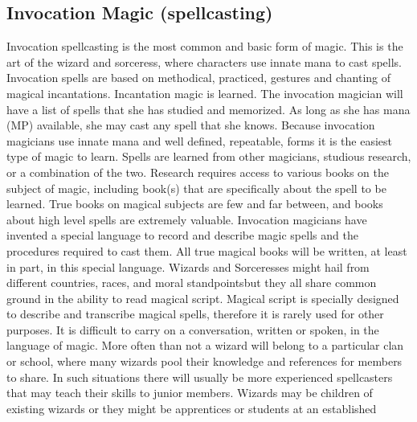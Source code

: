 \documentclass[twoside]{book}
\begin{document}
\subsection{Invocation Magic (spellcasting)}
      Invocation spellcasting is the most common and
               basic form of magic. This is the art of the wizard and
               sorceress, where characters use innate mana to cast
               spells. Invocation spells are based on methodical,
               practiced, gestures and chanting of magical incantations.
                 Incantation magic is learned. The invocation
               magician will have a list of spells that she has studied
               and memorized. As long as she has mana (MP) available, she
               may cast any spell that she knows. Because invocation
               magicians use innate mana and well defined, repeatable,
               forms it is the easiest type of magic to learn.   Spells are learned from other magicians, studious
               research, or a combination of the two. Research requires
               access to various books on the subject of magic, including
               book(s) that are specifically about the spell to be
               learned. True books on magical subjects are few and far
               between, and books about high level spells are extremely
               valuable. Invocation magicians have invented a special
               language to record and describe magic spells and the
               procedures required to cast them. All true magical books
               will be written, at least in part, in this special
               language. Wizards and Sorceresses might hail from
               different countries, races, and moral
               standpointsbut they all share common ground in the
               ability to read magical script. Magical script is
               specially designed to describe and transcribe magical
               spells, therefore it is rarely used for other purposes. It
               is difficult to carry on a conversation, written or
               spoken, in the language of magic.   More often than not a wizard will belong to a
               particular clan or school, where many wizards pool their
               knowledge and references for members to share. In such
               situations there will usually be more experienced
               spellcasters that may teach their skills to junior
               members. Wizards may be children of existing wizards or
               they might be apprentices or students at an established
\end{document}
